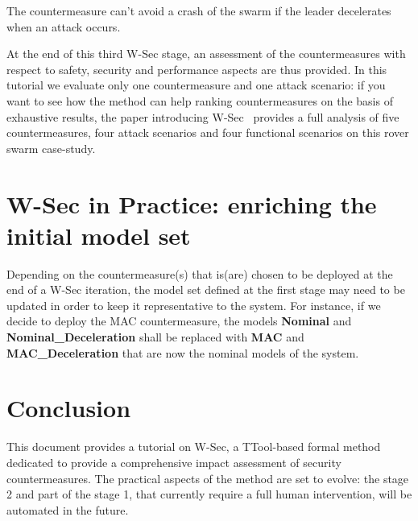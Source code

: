 \documentclass{article}
\begin{document}
The countermeasure can't avoid a crash of the swarm if the leader decelerates when an attack occurs.

At the end of this third W-Sec stage, an assessment of the countermeasures with respect to safety, security and performance aspects are thus provided. In this tutorial we evaluate only one countermeasure and one attack scenario: if you want to see how the method can help ranking countermeasures on the basis of exhaustive results, the paper introducing W-Sec~\cite{wsec} provides a full analysis of five countermeasures, four attack scenarios and four functional scenarios on this rover swarm case-study.



\section{W-Sec in Practice: enriching the initial model set}

Depending on the countermeasure(s) that is(are) chosen to be deployed at the end of a W-Sec iteration, the model set defined at the first stage may need to be updated in order to keep it representative to the system. For instance, if we decide to deploy the MAC countermeasure, the models \textbf{Nominal} and \textbf{Nominal\_Deceleration} shall be replaced with \textbf{MAC} and \textbf{MAC\_Deceleration} that are now the nominal models of the system.



\section{Conclusion}

This document provides a tutorial on W-Sec, a TTool-based formal method dedicated to provide a comprehensive impact assessment of security countermeasures. The practical aspects of the method are set to evolve: the stage 2 and part of the stage 1, that currently require a full human intervention, will be automated in the future.





\end{document}

